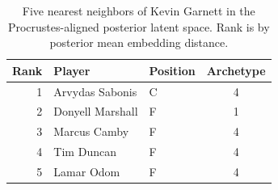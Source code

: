 \begin{table}[htbp]
  \centering\small
  \begin{tabular}{rllc}
    \toprule
    Rank & Player & Position & Archetype \\
    \midrule
    1 & Arvydas Sabonis & C & 4 \\
    2 & Donyell Marshall & F & 1 \\
    3 & Marcus Camby & F & 4 \\
    4 & Tim Duncan & F & 4 \\
    5 & Lamar Odom & F & 4 \\
    \bottomrule
  \end{tabular}
  \caption{Five nearest neighbors of Kevin Garnett in the Procrustes-aligned posterior latent space. Rank is by posterior mean embedding distance.}
  \label{tab:Kevin_Garnett_neighbors}
\end{table}

